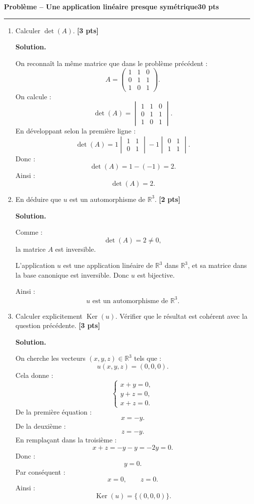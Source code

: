 \documentclass[11pt,a4paper]{article}
\newcommand{\pts}[1]{\hfill \textbf{[#1 pts]}}
\newcommand{\R}{\mathbb{R}}
\newcommand{\Ker}{\operatorname{Ker}}
\newcounter{probleme}
\newenvironment{probleme}[2]{
    \refstepcounter{probleme}
    \vspace{0.6cm}
    {\Large\color{bleu}\textbf{Problème \theprobleme{} -- #1}}\hfill \textbf{#2 pts}
    \par\medskip
    \hrule
    \medskip
}{\vspace{0.5cm}}
\newcommand{\solution}{
    \textbf{\color{bleu}Solution. }
}
\begin{document}
\begin{probleme}{Une application linéaire presque symétrique}{30}
\begin{enumerate}
    \item Calculer \(\det(A)\). \pts{3}

    \solution

    On reconnaît la même matrice que dans le problème précédent :
    \[
    A=
    \begin{pmatrix}
    1&1&0\\
    0&1&1\\
    1&0&1
    \end{pmatrix}.
    \]
    On calcule :
    \[
    \det(A)=
    \begin{vmatrix}
    1&1&0\\
    0&1&1\\
    1&0&1
    \end{vmatrix}.
    \]
    En développant selon la première ligne :
    \[
    \det(A)
    =
    1
    \begin{vmatrix}
    1&1\\
    0&1
    \end{vmatrix}
    -
    1
    \begin{vmatrix}
    0&1\\
    1&1
    \end{vmatrix}.
    \]
    Donc :
    \[
    \det(A)=1-(-1)=2.
    \]
    Ainsi :
    \[
    \boxed{\det(A)=2.}
    \]

    \item En déduire que \(u\) est un automorphisme de \(\R^3\). \pts{2}

    \solution

    Comme :
    \[
    \det(A)=2\neq 0,
    \]
    la matrice \(A\) est inversible.

    L'application \(u\) est une application linéaire de \(\R^3\) dans \(\R^3\), et sa matrice dans la base canonique est inversible. Donc \(u\) est bijective.

    Ainsi :
    \[
    \boxed{u\text{ est un automorphisme de }\R^3.}
    \]

    \item Calculer explicitement \(\Ker(u)\). Vérifier que le résultat est cohérent avec la question précédente. \pts{3}

    \solution

    On cherche les vecteurs \((x,y,z)\in\R^3\) tels que :
    \[
    u(x,y,z)=(0,0,0).
    \]
    Cela donne :
    \[
    \begin{cases}
    x+y=0,\\
    y+z=0,\\
    x+z=0.
    \end{cases}
    \]
    De la première équation :
    \[
    x=-y.
    \]
    De la deuxième :
    \[
    z=-y.
    \]
    En remplaçant dans la troisième :
    \[
    x+z=-y-y=-2y=0.
    \]
    Donc :
    \[
    y=0.
    \]
    Par conséquent :
    \[
    x=0,\qquad z=0.
    \]
    Ainsi :
    \[
    \boxed{\Ker(u)=\{(0,0,0)\}.}
    \]


\end{enumerate}
\end{probleme}
\end{document}
